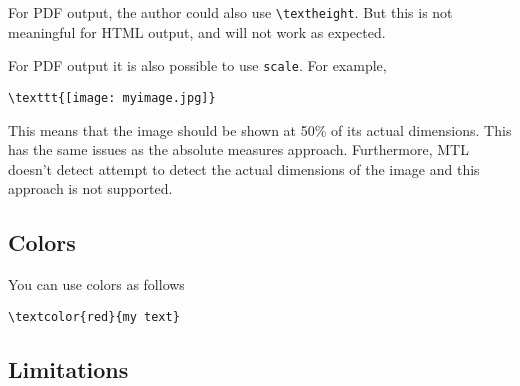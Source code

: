 \begin{note}
For PDF output, the author could also use \lstinline`\textheight`.
%
But this is not meaningful for HTML output, and will not work as expected.
\end{note}

\begin{important}
For PDF output it is also possible to use \lstinline'scale'.  For example,
\begin{lstlisting}
\texttt{[image: myimage.jpg]}
\end{lstlisting}

This means that the image should be shown at 50\% of its actual dimensions.  This has  the same issues as the absolute measures approach. Furthermore, MTL doesn't detect attempt to detect the actual dimensions of the image and this approach is not supported.
\end{important}

\subsection{Colors}

You can use colors as follows
\begin{lstlisting}
\textcolor{red}{my text}
\end{lstlisting}

\subsection{Limitations}
\label{sec:mtl::limitations}


